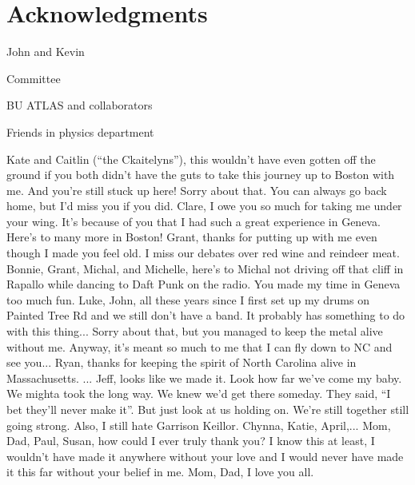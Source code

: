 \section*{Acknowledgments}

John and Kevin

Committee

BU ATLAS and collaborators

Friends in physics department

Kate and Caitlin (``the Ckaitelyns''), this wouldn't have even gotten off the ground  if you both didn't have the guts to take this journey up to Boston with me.  And you're still stuck up here!  Sorry about that. You can always go back home, but I'd miss you if you did. 
Clare, I owe you so much for taking me under your wing. It's because of you that I had such a great experience in Geneva. Here's to many more in Boston!
Grant, thanks for putting up with me even though I made you feel old. I miss our debates over red wine and reindeer meat.
Bonnie, Grant, Michal, and Michelle, here's to Michal not driving off that cliff in Rapallo while dancing to Daft Punk on the radio. You made my time in Geneva too much fun.
Luke,
John, all these years since I first set up my drums on Painted Tree Rd and we still don't have a band. It probably has something to do with this thing... Sorry about that, but you managed to keep the metal alive without me. Anyway, it's meant so much to me that I can fly down to NC and see you...
Ryan, thanks for keeping the spirit of North Carolina alive in Massachusetts. ...
Jeff, looks like we made it. Look how far we've come my baby. We mighta took the long way. We knew we'd get there someday. They said, ``I bet they'll never make it''. But just look at us holding on. We're still together still going strong. Also, I still hate Garrison Keillor.
Chynna,
Katie,
April,...
Mom, Dad, Paul, Susan, how could I ever truly thank you? I know this at least, I wouldn't have made it anywhere without your love and I would never have made it this far without your belief in me.
Mom,
Dad,
I love you all.
